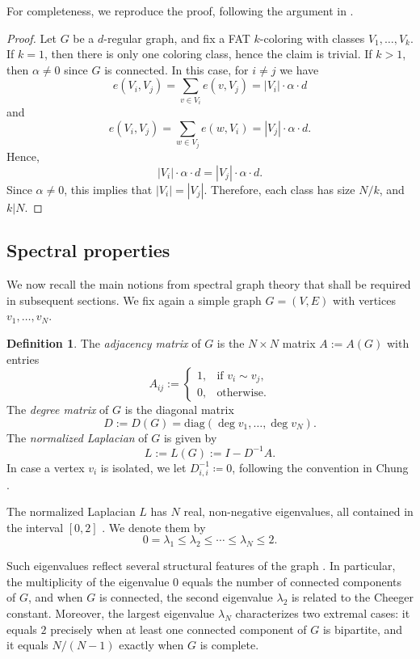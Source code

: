 \documentclass{article}
\theoremstyle{plain}
\theoremstyle{definition}
\newtheorem{definition}[theorem]{Definition}
\theoremstyle{remark}
\begin{document}
For completeness, we reproduce the proof, following the argument in \cite{beersmulasFAT}.

\begin{proof}
Let $G$ be a $d$-regular graph, and fix a FAT $k$-coloring with classes $V_1,\ldots,V_k$. If $k=1$, then there is only one coloring class, hence the claim is trivial. If $k>1$, then $\alpha\neq 0$ since $G$ is connected. In this case, for $i\neq j$ we have
$$
e(V_i,V_j)=\sum_{v\in V_i} e(v,V_j)=|V_i| \cdot \alpha \cdot d
$$ and
$$
e(V_i,V_j)=\sum_{w\in V_j} e(w,V_i)=|V_j| \cdot \alpha \cdot d.
$$
Hence, $$
|V_i| \cdot \alpha \cdot d=|V_j| \cdot \alpha \cdot d.
$$ Since $\alpha \neq 0$, this implies that $|V_i|=|V_j|$.  Therefore, each class has size $N/k$, and $k|N$. 
\end{proof}

\subsection{Spectral properties}

We now recall the main notions from spectral graph theory that shall be required in subsequent sections. We fix again a simple graph $G=(V,E)$ with vertices $v_1,\ldots,v_N$.

\begin{definition}
The \emph{adjacency matrix} of $G$ is the $N\times N$ matrix $A:=A(G)$ with entries
\[
A_{ij} :=
\begin{cases}
1, & \text{if } v_i\sim v_j,\\
0, & \text{otherwise.}
\end{cases}
\]
The \emph{degree matrix} of $G$ is the diagonal matrix
\[
D:=D(G)=\mathrm{diag}(\deg v_1,\ldots,\deg v_N).
\]
The \emph{normalized Laplacian} of $G$ is given by
\[
L:=L(G):=I-D^{-1}A.
\]
In case a vertex $v_i$ is isolated, we let $D_{i,i}^{-1}\coloneqq 0$, following the convention in Chung \cite{chung}.
\end{definition}

The normalized Laplacian $L$ has $N$ real, non-negative eigenvalues, all contained in the interval $[0,2]$ \cite{chung}. We denote them by
\[
0=\lambda_1\leq \lambda_2 \leq \cdots \leq \lambda_N \leq 2.
\]

Such eigenvalues reflect several structural features of the graph \cite{chung,BrouwerHaemers2012,spectra26}. In particular, the multiplicity of the eigenvalue $0$ equals the number of connected components of $G$, and when $G$ is connected, the second eigenvalue $\lambda_2$ is related to the Cheeger constant. Moreover, the largest eigenvalue $\lambda_N$ characterizes two extremal cases: it equals $2$ precisely when at least one connected component of $G$ is bipartite, and it equals $N/(N-1)$ exactly when $G$ is complete. \newline 
\end{document}
